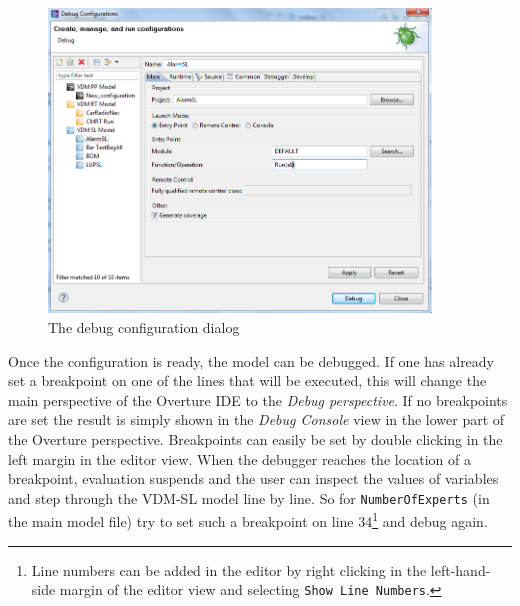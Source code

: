 \begin{figure}[htp]
\begin{center}
  \includegraphics[width=4in]{figures/debuglauncer}
  \caption{The debug configuration dialog}
  \label{fig:debugConfiguration}
\end{center}
\end{figure}
%
Once the configuration is ready, the model can be debugged. If one has already set a breakpoint on one of the lines that will be executed, this will change the main perspective of the Overture IDE to the \emph{Debug perspective}. If no breakpoints are set the result is simply shown in the \emph{Debug Console} view in the lower part of the Overture perspective. Breakpoints can easily be set by double clicking in the left margin in the editor view. When the debugger reaches the location of a breakpoint, evaluation suspends and the user can inspect the values of variables and step through the VDM-SL model line by line. So for \texttt{NumberOfExperts} (in the main model file) try to set such a breakpoint on line 34\footnote{Line numbers can be added in the editor by right clicking in the left-hand-side margin of the editor view and selecting \texttt{Show Line Numbers}.}
and debug again.
%

